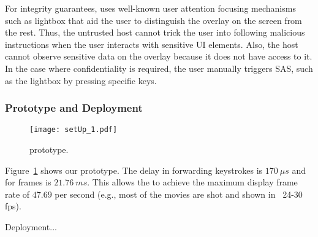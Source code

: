 For integrity guarantees, \name uses well-known user attention focusing mechanisms such as lightbox that aid the user to distinguish the \protection overlay on the screen from the rest. Thus, the untrusted host cannot trick the user into following malicious instructions when the user interacts with sensitive UI elements. Also, the host cannot observe sensitive data on the overlay because it does not have access to it. In the case where confidentiality is required, the user manually triggers SAS, such as the lightbox by pressing specific keys.


\subsubsection*{Prototype and Deployment}

\begin{figure}[t]
	\centering
	\texttt{[image: setUp\_1.pdf]}
	\caption{\protection prototype.}
\label{fig:prototypeArch}   
\end{figure}

Figure~\ref{fig:prototypeArch} shows our \protection prototype.
The delay in forwarding keystrokes is $170\ \mu s$ and for frames is $21.76\ ms$. This allows the \protection to achieve the maximum display frame rate of $47.69$ per second (e.g., most of the movies are shot and shown in  ~24-30 fps).

Deployment...





